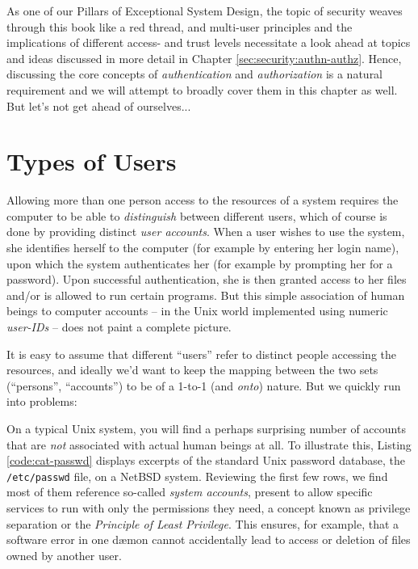 As one of our Pillars of Exceptional System Design,
the topic of security weaves through this book like a
red thread, and multi-user principles and the
implications of different access- and trust levels
necessitate a look ahead at topics and ideas discussed
in more detail in Chapter
\ref{sec:security:authn-authz}.  Hence, discussing
the core concepts of {\em
authentication} and {\em
authorization} is a natural
requirement and we will attempt to broadly cover them
in this chapter as well.  But let's not get ahead of
ourselves...


\section{Types of Users}
\label{multi-user:types}

Allowing more than one person access to the resources
of a system requires the computer to be able to {\em
distinguish} between different users, which of course
is done by providing distinct {\em user accounts}.
When a user wishes to use the system, she identifies
herself to the computer (for example by entering her
login name), upon which the system authenticates her
(for example by prompting her for a password). Upon
successful authentication, she is then granted access
to her files and/or is allowed to run certain
programs.  But this simple association of human beings
to computer accounts -- in the Unix world implemented
using numeric {\em user-IDs} -- does not paint a
complete picture.

It is easy to assume that different ``users'' refer to
distinct people accessing the resources, and ideally
we'd want to keep the mapping between the two sets
(``persons'', ``accounts'') to be of a 1-to-1 (and
{\em onto}) nature.  But we quickly run into problems:

On a typical Unix system, you will find a perhaps
surprising number of accounts that are {\em not}
associated with actual human beings at all. To
illustrate this, Listing \ref{code:cat-passwd}
displays excerpts of the standard Unix password
database, the {\tt /etc/passwd} file, on a NetBSD
system.  Reviewing the first few rows, we find most of
them reference so-called {\em system
accounts}, present to allow
specific services to run with only the permissions
they need, a concept known as privilege
separation or the
{\em Principle of Least Privilege}. This ensures, for example, that a
software error in one d\ae mon cannot accidentally
lead to access or deletion of files owned by another
user.

